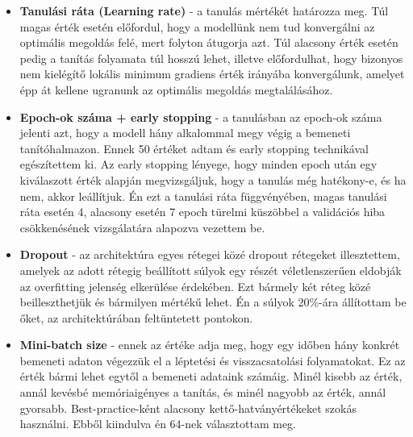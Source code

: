 \begin{itemize}
 \item \textbf{Tanulási ráta (Learning rate)} - a tanulás mértékét határozza meg. Túl magas érték esetén előfordul, hogy a modellünk nem tud konvergálni az optimális megoldás felé, mert folyton átugorja azt. Túl alacsony érték esetén pedig a tanítás folyamata túl hosszú lehet, illetve előfordulhat, hogy bizonyos nem kielégítő lokális minimum gradiens érték irányába konvergálunk, amelyet épp át kellene ugranunk az optimális megoldás megtalálásához.
 \item \textbf{Epoch-ok száma + early stopping} - a tanulásban az epoch-ok száma jelenti azt, hogy a modell hány alkalommal megy végig a bemeneti tanítóhalmazon. Ennek 50 értéket adtam és early stopping technikával egészítettem ki. Az early stopping lényege, hogy minden epoch után egy kiválaszott érték alapján megvizsgáljuk, hogy a tanulás még hatékony-e, és ha nem, akkor leállítjuk. Én ezt a tanulási ráta függvényében, magas tanulási ráta esetén 4, alacsony esetén 7 epoch türelmi küszöbbel a validációs hiba csökkenésének vizsgálatára alapozva vezettem be.
 \item \textbf{Dropout} - az architektúra egyes rétegei közé dropout rétegeket illesztettem, amelyek az adott rétegig beállított súlyok egy részét véletlenszerűen eldobják az overfitting jelenség elkerülése érdekében. Ezt bármely két réteg közé beilleszthetjük és bármilyen mértékű lehet. Én a súlyok 20\%-ára állítottam be őket, az architektúrában feltüntetett pontokon.
 \item \textbf{Mini-batch size} - ennek az értéke adja meg, hogy egy időben hány konkrét bemeneti adaton végezzük el a léptetési és visszacsatolási folyamatokat. Ez az érték bármi lehet egytől a bemeneti adataink számáig. Minél kisebb az érték, annál kevésbé memóriaigényes a tanítás, és minél nagyobb az érték, annál gyorsabb. Best-practice-ként alacsony kettő-hatványértékeket szokás használni. Ebből kiindulva én 64-nek választottam meg.
\end{itemize}